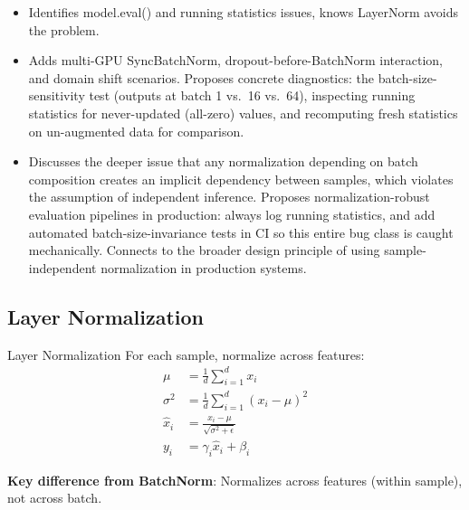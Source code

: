 \begin{interviewq}
\goodgreat
\begin{itemize}
    \item {} Identifies model.eval() and running statistics issues, knows LayerNorm avoids the problem.
    \item {} Adds multi-GPU SyncBatchNorm, dropout-before-BatchNorm interaction, and domain shift scenarios. Proposes concrete diagnostics: the batch-size-sensitivity test (outputs at batch 1 vs.\ 16 vs.\ 64), inspecting running statistics for never-updated (all-zero) values, and recomputing fresh statistics on un-augmented data for comparison.
    \item {} Discusses the deeper issue that any normalization depending on batch composition creates an implicit dependency between samples, which violates the assumption of independent inference. Proposes normalization-robust evaluation pipelines in production: always log running statistics, and add automated batch-size-invariance tests in CI so this entire bug class is caught mechanically. Connects to the broader design principle of using sample-independent normalization in production systems.
\end{itemize}

\end{interviewq}

\subsection{Layer Normalization}

\begin{mathresult}{Layer Normalization}
For each sample, normalize across features:
\begin{align}
\mu &= \frac{1}{d}\sum_{i=1}^d x_i \\
\sigma^2 &= \frac{1}{d}\sum_{i=1}^d (x_i - \mu)^2 \\
\hat{x}_i &= \frac{x_i - \mu}{\sqrt{\sigma^2 + \epsilon}} \\
y_i &= \gamma_i \hat{x}_i + \beta_i
\end{align}
\end{mathresult}

\textbf{Key difference from BatchNorm}: Normalizes across features (within sample), not across batch.

